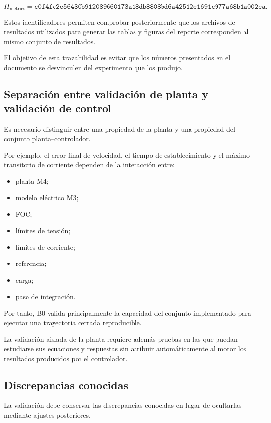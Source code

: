 \begin{equation}
H_{\mathrm{metrics}}
=
\texttt{c0f4fc2e56430b912089660173a18db8808bd6a42512e1691c977a68b1a002ea}.
\end{equation}

Estos identificadores permiten comprobar posteriormente que los archivos de resultados utilizados para generar las tablas y figuras del reporte corresponden al mismo conjunto de resultados.

El objetivo de esta trazabilidad es evitar que los números presentados en el documento se desvinculen del experimento que los produjo.

\subsection{Separación entre validación de planta y validación de control}

Es necesario distinguir entre una propiedad de la planta y una propiedad del conjunto planta--controlador.

Por ejemplo, el error final de velocidad, el tiempo de establecimiento y el máximo transitorio de corriente dependen de la interacción entre:

\begin{itemize}
    \item planta M4;
    \item modelo eléctrico M3;
    \item FOC;
    \item límites de tensión;
    \item límites de corriente;
    \item referencia;
    \item carga;
    \item paso de integración.
\end{itemize}

Por tanto, B0 valida principalmente la capacidad del conjunto implementado para ejecutar una trayectoria cerrada reproducible.

La validación aislada de la planta requiere además pruebas en las que puedan estudiarse sus ecuaciones y respuestas sin atribuir automáticamente al motor los resultados producidos por el controlador.

\subsection{Discrepancias conocidas}

La validación debe conservar las discrepancias conocidas en lugar de ocultarlas mediante ajustes posteriores.

